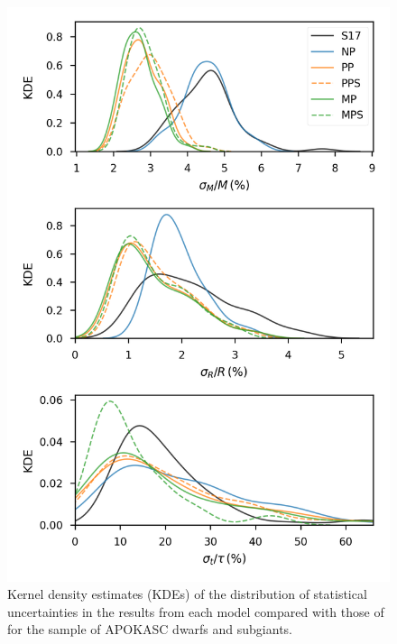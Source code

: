 \begin{figure}[!tb]
    \centering
    \includegraphics{figures/unc-comp.png}
    \caption[Kernel density estimates of the distribution of statistical uncertainties in the results from each model.]{Kernel density estimates (KDEs) of the distribution of statistical uncertainties in the results from each model compared with those of  for the sample of APOKASC dwarfs and subgiants.}
    \label{fig:unc-comp}
\end{figure}

